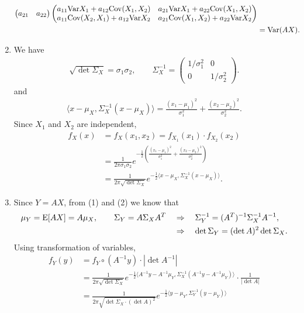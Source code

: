\begin{enumerate}
\begin{align*}
\begin{pmatrix}
	a_{21} & a_{22}
	\end{pmatrix}\begin{pmatrix}
	a_{11}\mathrm{Var}X_1 + a_{12}\mathrm{Cov}(X_1, X_2) & a_{21}\mathrm{Var}X_1 + a_{22}\mathrm{Cov}(X_1, X_2) \\
	a_{11}\mathrm{Cov}(X_2, X_1) + a_{12}\mathrm{Var}X_2 & a_{21}\mathrm{Cov}(X_1, X_2) + a_{22}\mathrm{Var}X_2
	\end{pmatrix} \\
	& = \mathrm{Var}(AX).
	\end{align*}
	\item We have
	\begin{align*}
	\sqrt{\det \Sigma_X} = \sigma_1\sigma_2, \qquad \Sigma_X^{-1} = \begin{pmatrix}
	1/\sigma_1^2 & 0 \\
	0 & 1/\sigma_2^2
	\end{pmatrix}.
	\end{align*}
	and
	\begin{align*}
	\langle x - \mu_X, \Sigma_X^{-1}(x - \mu_X)\rangle = \frac{(x_1 - \mu_1)^2}{\sigma_1^2} + \frac{(x_2 - \mu_2)^2}{\sigma_2^2}.
	\end{align*}
	Since $X_1$ and $X_2$ are independent, 
	\begin{align*}
	f_X(x) & = f_X(x_1, x_2) = f_{X_1}(x_1)\cdot f_{X_2}(x_2) \\
	& = \frac{1}{2\pi \sigma_1\sigma_2} e^{-\frac{1}{2}\left(\frac{(x_1 - \mu_1)^2}{\sigma_1^2} + \frac{(x_2-\mu_2)^2}{\sigma_2^2} \right)} \\
	& = \frac{1}{2\pi \sqrt{\det \Sigma_X}} e^{-\frac{1}{2}\langle x-\mu_X, \Sigma_X^{-1}(x-\mu_X)\rangle}.
	\end{align*}
	\item Since $Y = AX$, from (1) and (2) we know that
	\begin{align*}
	\mu_Y = \mathrm{E}[AX] = A\mu_X, \qquad \Sigma_Y = A\Sigma_X A^T \quad & \Rightarrow\quad \Sigma_Y^{-1} = (A^T)^{-1}\Sigma_X^{-1}A^{-1}, \\
	& \Rightarrow\quad \det\Sigma_Y = (\det A)^2\det\Sigma_X.
	\end{align*}
	Using transformation of variables,
	\begin{align*}
	f_Y(y) & = f_Y\circ (A^{-1}y) \cdot |\det A^{-1}| \\
	& = \frac{1}{2\pi \sqrt{\det\Sigma_X}} e^{-\frac{1}{2}\langle A^{-1}y - A^{-1}\mu_Y, \Sigma_X^{-1}(A^{-1}y - A^{-1}\mu_Y)\rangle} \cdot \frac{1}{|\det A|} \\
	& = \frac{1}{2\pi \sqrt{\det \Sigma_X \cdot (\det A)^2}} e^{-\frac{1}{2}\langle y - \mu_Y, \Sigma_Y^{-1}(y - \mu_Y)\rangle} \\

\end{align*}
\end{enumerate}
